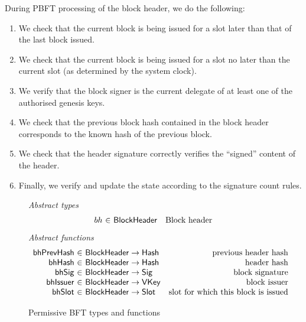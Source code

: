 \documentclass[11pt,a4paper]{article}
\newcommand{\fun}[1]{\mathsf{#1}}
\newcommand{\type}[1]{\mathsf{#1}}
\newcommand{\totalf}{\to}
\newcommand{\Hash}{\type{Hash}}  %
\newcommand{\Slot}{\type{Slot}}
\newcommand{\VKey}{\type{VKey}}
\newcommand{\Sig}{\type{Sig}}
\newcommand{\bhsigname}{bhSig}
\newcommand{\bhissuername}{bhIssuer}
\begin{document}
During PBFT processing of the block header, we do the following:
\begin{enumerate}
 \item We check that the current block is being issued for a slot later than
    that of the last block issued.
  \item We check that the current block is being issued for a slot no later than
    the current slot (as determined by the system clock).
  \item We verify that the block signer is the current delegate of at least one
    of the authorised genesis keys.
  \item We check that the previous block hash contained in the block header
    corresponds to the known hash of the previous block.
  \item We check that the header signature correctly verifies the ``signed''
    content of the header.
  \item Finally, we verify and update the state according to the signature count rules.
  \end{enumerate}
  \begin{figure}[ht]
  \emph{Abstract types}
  \begin{equation*}
    \begin{array}{r@{~\in~}lr}
      bh & \Bhead & \text{Block header}
    \end{array}
  \end{equation*}
  \emph{Abstract functions}
  \begin{equation*}
    \begin{array}{r@{~\in~}lr}
      \fun{\bhprevhashname} & \Bhead \totalf \Hash & \text{previous header hash} \\
      \fun{\bhhashname} & \Bhead \totalf \Hash & \text{header hash} \\
      \fun{\bhsigname} & \Bhead \totalf \Sig & \text{block signature} \\
      \fun{\bhissuername} & \Bhead \totalf \VKey & \text{block issuer} \\
      \fun{\bhslotname} & \Bhead \totalf \Slot & \text{slot for which this block is issued}
    \end{array}
  \end{equation*}
  \caption{Permissive BFT types and functions}
  \label{fig:defs:pbft}
\end{figure}
\end{document}
